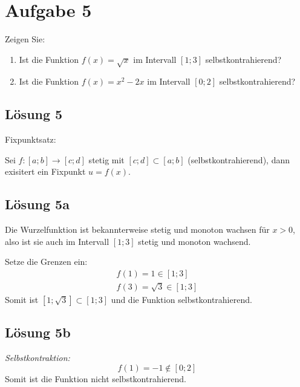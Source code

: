 \documentclass[main.tex]{subfiles}
\begin{document}
\section{Aufgabe 5}
Zeigen Sie:

\begin{enumerate}
    \item Ist die Funktion $f( x) =\sqrt{x}$ im Intervall $[ 1;3]$ selbstkontrahierend?
    \item Ist die Funktion $f( x) =x^{2} -2x$ im Intervall $[ 0;2]$ selbstkontrahierend?
\end{enumerate}

\subsection{Lösung 5}
Fixpunktsatz:

Sei $f:[ a;b]\rightarrow [ c;d]$ stetig mit $[ c;d] \subset [ a;b]$ (selbstkontrahierend), dann exisitert ein Fixpunkt $u=f( x)$.

\subsection{Lösung 5a}
Die Wurzelfunktion ist bekannterweise stetig und monoton wachsen für $x >0$, also ist sie auch im Intervall $[ 1;3]$ stetig und monoton wachsend.

Setze die Grenzen ein:
\begin{gather*}
f( 1) =1\in [ 1;3]\\
f( 3) =\sqrt{3} \in [ 1;3]
\end{gather*}
Somit ist $\left[ 1;\sqrt{3}\right] \subset [ 1;3]$ und die Funktion selbstkontrahierend.

\subsection{Lösung 5b}

\textit{Selbstkontraktion:}
\begin{equation*}
f( 1) =-1\notin [ 0;2]
\end{equation*}
Somit ist die Funktion nicht selbstkontrahierend.
\end{document}
